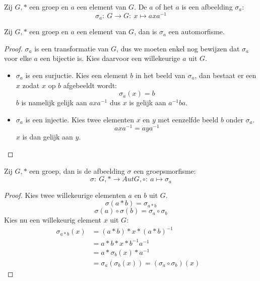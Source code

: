 \documentclass[main.tex]{subfiles}
\begin{document}
\begin{de}
  \label{de:sigma-a}
  Zij $G,*$ een groep en $a$ een element van $G$.
  De  $a$ of het  $a$ is een afbeelding $\sigma_{a}$:
  \[ \sigma_{a}:\ G \rightarrow G:\ x \mapsto axa^{-1} \]
\end{de}

\begin{ei}
  Zij $G,*$ een groep en $a$ een element van $G$, dan is $\sigma_{a}$ een automorfisme.
  
  \begin{proof}
    $\sigma_{a}$ is een transformatie van $G$, dus we moeten enkel nog bewijzen dat $\sigma_{a}$ voor elke $a$ een bijectie is.
    Kies daarvoor een willekeurige $a$ uit $G$.
    \begin{itemize}
    \item $\sigma_{a}$ is een surjuctie.
      Kies een element $b$ in het beeld van $\sigma_{a}$, dan bestaat er een $x$ zodat $x$ op $b$ afgebeeldt wordt:
      \[ \sigma_{a}(x) = b \]
      $b$ is namelijk gelijk aan $axa^{-1}$ dus $x$ is gelijk aan $a^{-1}ba$.
    \item $\sigma_{a}$ is een injectie.
      Kies twee elementen $x$ en $y$ met eenzelfde beeld $b$ onder $\sigma_{a}$.
      \[ axa^{-1} = aya^{-1} \]
      $x$ is dan gelijk aan $y$.
    \end{itemize}
  \end{proof}
\end{ei}

\begin{ei}
  Zij $G,*$ een groep, dan is de afbeelding $\sigma$ een groepsmorfisme:
  \[ \sigma:\ G,* \rightarrow Aut G,\circ:\ a \mapsto \sigma_{a} \]

  \begin{proof}
    Kies twee willekeurige elementen $a$ en $b$ uit $G$.
    \[ \sigma(a * b) = \sigma_{a * b}\]
    \[ \sigma(a) \circ \sigma(b) = \sigma_{a} \circ \sigma_{b} \]
    Kies nu een willekeurig element $x$ uit $G$:
    \[
    \begin{array}{rll}
      \sigma_{a * b}(x) &= (a*b)*x*(a*b)^{-1} &\\
                       &= a*b*x*b^{-1}a^{-1} &\\
                       &= a*\sigma_{b}(x)*a^{-1} &\\
                       &= \sigma_{a}(\sigma_{b}(x)) = (\sigma_{a} \circ \sigma_{b})(x)      
    \end{array}
    \]
  \end{proof}
\end{ei}
\end{document}

